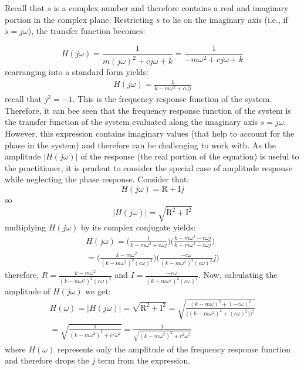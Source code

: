 \documentclass[12pt,letter]{article}
\numberwithin{ex}{section} %
\numberwithin{re}{section} %
\begin{document}
Recall that $s$ is a complex number and therefore contains a real and imaginary portion in the complex plane. Restricting $s$ to lie on the imaginary axis (i.e., if $s = j\omega$), the transfer function becomes:

\begin{equation}
H(j\omega) = \frac{1}{m(j\omega)^2+cj\omega+k} = \frac{1}{-m\omega^2+cj\omega+k} 
\end{equation}
rearranging into a standard form yields:
\begin{eqnarray}
H(j\omega) = \frac{1}{k-m\omega^2+c\omega j}
\label{eq:frequency_response_function}
\end{eqnarray}
recall that $j^2=-1$. This is the frequency response function of the system. Therefore, it can bee seen that the frequency response function of the system is the transfer function of the system evaluated along the imaginary axis $s=j\omega$. However, this expression contains imaginary values (that help to account for the phase in the system) and therefore can be challenging to work with. As the amplitude $|H(j\omega)|$ of the response (the real portion of the equation) is useful to the practitioner, it is prudent to consider the special case of amplitude response while neglecting the phase response. Consider that:
\begin{equation}
	H(j\omega) = \text{R}+\text{I}j
\end{equation}  
so
\begin{equation}
	 |H(j\omega)|=\sqrt{\text{R}^2+\text{I}^2}
\end{equation}  
multiplying $H(j\omega)$ by its complex conjugate yields:
\begin{multline}
	 H(j\omega) = \bigg( \frac{1}{k-m\omega^2+c\omega j} \bigg) \bigg( \frac{k-m\omega^2-c\omega j}{k-m\omega^2-c\omega j}\bigg) \\ =  \bigg( \frac{k-m\omega^2}{(k-m\omega^2)^2(c\omega)^2} \bigg) \bigg( \frac{-c\omega}{(k-m\omega^2)^2(c\omega)^2}j\bigg) 
\end{multline}  
therefore, $R = \frac{k-m\omega^2}{(k-m\omega^2)^2(c\omega)^2} $ and $I = \frac{-c\omega}{(k-m\omega^2)^2(c\omega)^2}$. Now, calculating the amplitude of $H(j\omega)$ we get:
\begin{multline}
H(\omega) = |H(j\omega)| = \sqrt{\text{R}^2+\text{I}^2} =  \sqrt{\frac{(k-m\omega)^2+(-c\omega)^2}{\big((k-m\omega^2)^2+(c\omega)^2)\big)^2}} \\ 
= \sqrt{\frac{1}{(k-m\omega^2)^2+c^2\omega^2}} = \frac{1}{\sqrt{(k-m\omega^2)^2+c^2\omega^2}}
\end{multline}
where $H(\omega)$ represents only the amplitude of the frequency response function and therefore drops the $j$ term from the expression. 
\end{document}
